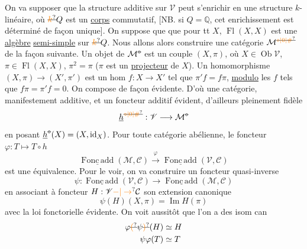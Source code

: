 On va supposer que la structure additive sur $\mathscr V$ peut s'enrichir en une structure $k$-linéaire, où $\deleted{\unsure{k}}Q$ est un \uline{corps} commutatif,
[NB. si $Q=\mathbb Q$, cet enrichissement est déterminé de façon unique]. On suppose que  que pour tt $X$, $\operatorname{Fl}(X,X)$ est une \uline{algèbre}  \uline{semi-simple} sur $\deleted{\unsure{k}}Q$. Nous allons alors  construire une catégorie $\mathcal M^{\deleted{\unsure{\circ|0|\#}}}$ de la façon suivante. Un objet de $\mathcal M^{\deleted{\circ}}$ est un couple $(X,\pi)$, où $X\in\operatorname{Ob}\mathscr V$, $\pi\in\operatorname{Fl}(X,X)$, $\pi^2=\pi$ ($\pi$ est un \uline{projecteur} de $X$). Un homomorphisme $(X,\pi)\to(X',\pi')$ est un hom $f:X\to X'$ tel que $\pi'f=f\pi$, \uline{modulo} les $f$ tels que $f\pi=\pi'f=0$.
On compose de façon évidente. D'où une catégorie, manifestement additive, et un foncteur additif
évident, d'ailleurs pleinement fidèle
\[
 \underline h^{\deleted{\unsure{\circ|0|\#}}}:\mathscr V\longrightarrow\mathcal M^{\deleted{\circ}}
\]
en posant $\underline h^{\deleted{\circ}}(X)=(X,\mathrm{id}_X)$. Pour toute catégorie abélienne,
le foncteur $\varphi:T\mapsto T\circ h$
\[
 \underline{\operatorname{Fonc\,add}}(\mathcal M,\mathcal C)\xrightarrow{\varphi}\underline{\operatorname{Fonc\,add}}(\mathscr V,\mathcal C)
\]
est une  équivalence. Pour le voir, on va construire un foncteur quasi-inverse 
\[
 \psi:\underline{\operatorname{Fonc\,add}}(\mathscr V,\mathcal C)\longrightarrow\underline{\operatorname{Fonc\,add}}(\mathcal M,\mathcal C)
\]
en associant à  foncteur $H:\mathscr V\unsure{\mathord{-}|\to}\mathcal C$ son extension canonique
\[
 \psi(H)(X,\pi)=\operatorname{Im}H(\pi)
\]
avec la loi fonctorielle évidente. On voit aussitôt que l'on a des isom can
\[
\begin{aligned}
 \varphi\deleted{\unsure{(}}\psi\deleted{\unsure{)}}(H)&\simeq H\\
 \psi\varphi(T)&\simeq T
\end{aligned}
\]

